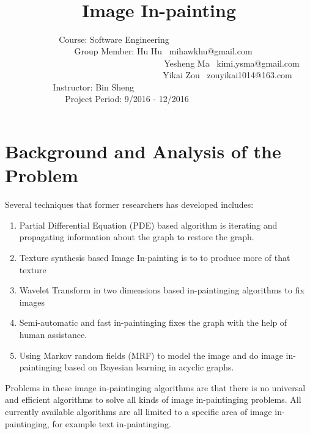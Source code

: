 \documentclass[12pt]{article}
\begin{document}
\title{\huge\textbf{\ \\ \ \\Image In-painting}\vspace{11cm}}
\author{	
	\large
	Course: Software Engineering\ \ \ \ \ \ \  \ \  \  \  \ \ \ \ \ \  \ \ \ \ \\
	\ \ \ \ \ \ \ \ \ \ \ Group Member: Hu Hu \ mihawkhu@gmail.com\ \ \ \ \ \ \ \ \ \\
	\ \ \ \ \ \ \ \ \  \ \ \ \ \ \ \ \ \ \ \ \ \ \ \ \ \ \ \ \ \ \ \ \ \ Yesheng Ma \ kimi.ysma@gmail.com \\
	\ \ \ \ \ \ \ \ \  \ \ \ \ \ \ \ \ \ \ \ \ \ \ \ \ \ \ \ \ \ \   \ Yikai Zou \ zouyikai1014@163.com\\
	Instructor: Bin Sheng \ \ \ \ \ \ \ \  \ \ \ \ \ \ \ \ \ \ \ \ \ \ \  \ \ \ \ \ \ \ \\
	Project Period: 9/2016 - 12/2016\ \ \ \ \  \ \ \ \ \ \ \ \ \ \ 	
	} \date{ }

\maketitle\thispagestyle{empty}
\newpage
\tableofcontents\thispagestyle{empty}
\newpage




\section{Background and Analysis of the Problem}
Several techniques that former researchers has developed includes:
\begin{enumerate}[1.]
	\item Partial Differential Equation (PDE) based algorithm is iterating and propagating information about the graph to restore the graph.
	\item Texture synthesis based Image In-painting is to to produce more of that texture
	\item Wavelet Transform in two dimensions based in-paintinging algorithms to fix images
	\item Semi-automatic and fast in-paintinging fixes the graph with the help of human assistance.
	\item Using Markov random fields (MRF) to model the image and do image in-paintinging based on Bayesian learning in acyclic graphs.
\end{enumerate}
Problems in these image in-paintinging algorithms are that there is no universal and 
efficient algorithms to solve all kinds of image in-paintinging problems.
All currently available algorithms are all limited to a specific area of image
in-paintinging, for example text in-paintinging.
\end{document}

